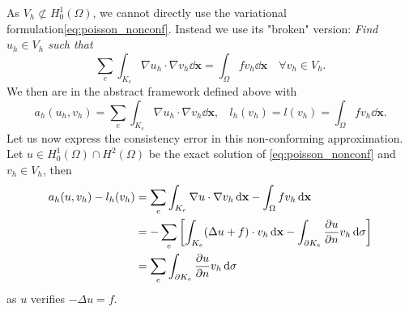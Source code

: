 As  $V_h \not\subset H^1_0(\Omega)$, we cannot directly use the variational formulation\eqref{eq:poisson_nonconf}. Instead we use its "broken" version:
\emph{Find $u_h \in V_h $ such that}
\begin{equation}\label{eq:poisson_nonconf}
\sum_e \int_{K_e} \nabla u_h\cdot \nabla v_h \dd \mathbf{x} = \int_\Omega f v_h \dd \mathbf{x}\quad\forall v_h\in V_h.
\end{equation}
We then are in the abstract framework defined above with
$$a_h(u_h,v_h)=\sum_e \int_{K_e} \nabla u_h\cdot \nabla v_h \dd \mathbf{x} , ~~~~
l_h(v_h)=l(v_h) = \int_\Omega f v_h \dd \mathbf{x}.$$
Let us now express the consistency error in this non-conforming approximation. Let $u\in H^1_0(\Omega)\cap H^2(\Omega)$ be the exact solution of \eqref{eq:poisson_nonconf} and $v_h\in V_h$, then
\begin{align}
a_h(u,v_h)-l_h(v_h)&= 
\sum_e \int_{K_e} \nabla u \cdot \nabla v_h \,{\rm d} \mathbf{x} - \int_\Omega f v_h \,{\rm d} \mathbf{x} \\
&= -\sum_e \left[\int_{K_e} (\Delta u +f) \cdot  v_h \,{\rm d} \mathbf{x} - \int_{\partial{K_e}} \frac{\partial u}{\partial n} v_h \,{\rm d} \sigma \right] \\
&= \sum_e \int_{\partial{K_e}} \frac{\partial u}{\partial n} v_h \,{\rm d} \sigma
\end{align}
as $u$ verifies $-\Delta u =f$. 

